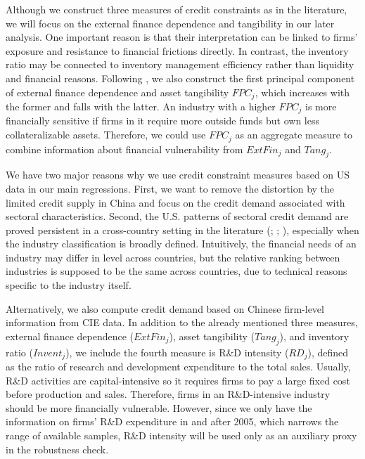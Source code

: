 \documentclass[12pt]{article}
\begin{document}
Although we construct three measures of credit constraints as in the literature, we will focus on the external finance dependence and tangibility in our later analysis. One important reason is that their interpretation can be linked to firms' exposure and resistance to financial frictions directly. In contrast, the inventory ratio may be connected to inventory management efficiency rather than liquidity and financial reasons. Following \cite{manova-wei-zhang2015}, we also construct the first principal component of external finance dependence and asset tangibility $FPC_j$, which increases with the former and falls with the latter. An industry with a higher $FPC_j$ is more financially sensitive if firms in it require more outside funds but own less collateralizable assets. Therefore, we could use $FPC_j$ as an aggregate measure to combine information about financial vulnerability from $ExtFin_j$ and $Tang_j$.

We have two major reasons why we use credit constraint measures based on US data in our main regressions. First, we want to remove the distortion by the limited credit supply in China and focus on the credit demand associated with sectoral characteristics. Second, the U.S. patterns of sectoral credit demand are proved persistent in a cross-country setting in the literature (\cite{kroszner2007}; \cite{manova-wei-zhang2015}; \cite{fan-lai-li2015}), especially when the industry classification is broadly defined. Intuitively, the financial needs of an industry may differ in level across countries, but the relative ranking between industries is supposed to be the same across countries, due to technical reasons specific to the industry itself.

Alternatively, we also compute credit demand based on Chinese firm-level information from CIE data. In addition to the already mentioned three measures, external finance dependence ($ExtFin_j$), asset tangibility ($Tang_j$), and inventory ratio ($Invent_j$), we include the fourth measure is R\&D intensity ($RD_j$), defined as the ratio of research and development expenditure to the total sales. Usually, R\&D activities are capital-intensive so it requires firms to pay a large fixed cost before production and sales. Therefore, firms in an R\&D-intensive industry should be more financially vulnerable. However, since we only have the information on firms' R\&D expenditure in and after 2005, which narrows the range of available samples, R\&D intensity will be used only as an auxiliary proxy in the robustness check. 
\end{document}
